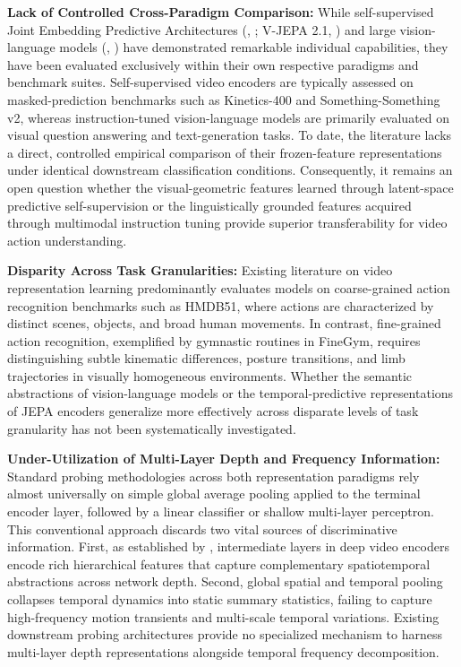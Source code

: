 \textbf{Lack of Controlled Cross-Paradigm Comparison:} While self-supervised Joint Embedding Predictive Architectures (\vjepaa{}, \citealp{assran2025vjepa2}; V-JEPA 2.1, \citealp{murlabadia2026vjepa21}) and large vision-language models (\qwenvl{}, \citealp{bai2025qwen2vl, qwen2025qwen3vl}) have demonstrated remarkable individual capabilities, they have been evaluated exclusively within their own respective paradigms and benchmark suites. Self-supervised video encoders are typically assessed on masked-prediction benchmarks such as Kinetics-400 and Something-Something v2, whereas instruction-tuned vision-language models are primarily evaluated on visual question answering and text-generation tasks. To date, the literature lacks a direct, controlled empirical comparison of their frozen-feature representations under identical downstream classification conditions. Consequently, it remains an open question whether the visual-geometric features learned through latent-space predictive self-supervision or the linguistically grounded features acquired through multimodal instruction tuning provide superior transferability for video action understanding.

\textbf{Disparity Across Task Granularities:} Existing literature on video representation learning predominantly evaluates models on coarse-grained action recognition benchmarks such as HMDB51, where actions are characterized by distinct scenes, objects, and broad human movements. In contrast, fine-grained action recognition, exemplified by gymnastic routines in FineGym, requires distinguishing subtle kinematic differences, posture transitions, and limb trajectories in visually homogeneous environments. Whether the semantic abstractions of vision-language models or the temporal-predictive representations of JEPA encoders generalize more effectively across disparate levels of task granularity has not been systematically investigated.

\textbf{Under-Utilization of Multi-Layer Depth and Frequency Information:} Standard probing methodologies across both representation paradigms rely almost universally on simple global average pooling applied to the terminal encoder layer, followed by a linear classifier or shallow multi-layer perceptron. This conventional approach discards two vital sources of discriminative information. First, as established by \citet{murlabadia2026vjepa21}, intermediate layers in deep video encoders encode rich hierarchical features that capture complementary spatiotemporal abstractions across network depth. Second, global spatial and temporal pooling collapses temporal dynamics into static summary statistics, failing to capture high-frequency motion transients and multi-scale temporal variations. Existing downstream probing architectures provide no specialized mechanism to harness multi-layer depth representations alongside temporal frequency decomposition.

